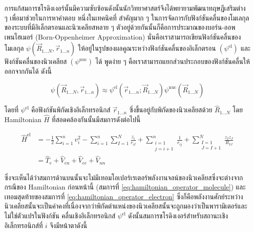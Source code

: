 การแก้สมการชโรดิงเงอร์นั้นมีความซับซ้อนดังนั้นนักวิทยาศาสตร์จึงได้พยายามพัฒนาทฤษฎีเสริมต่าง ๆ เพื่อมาช่วยในการหาคำตอบ หนึ่งในเทคนิคที่%
สำคัญมาก ๆ ในการจัดการกับฟังก์ชันคลื่นของโมเลกุลของระบบที่มีอิเล็กตรอนและนิวเคลียสหลาย ๆ ตัวอยู่ด้วยกันนั้นก็คือการประมาณของบอร์น-ออพเพนไฮเมอร์
(Born-Oppenheimer Approximation) นั่นคือเราสามารถเขียนฟังก์ชันคลื่นของโมเลกุล $\psi\left(\vec{R}_{1 \ldots N}, \vec{r}_{1
    \ldots n}\right)$ ให้อยู่ในรูปของผลคูณระหว่างฟังก์ชันคลื่นของอิเล็กตรอน $(\psi^{\mathrm{el}})$ และฟังก์ชันคลื่นของนิวเคลียส
$(\psi^{\text{nuc}})$ ได้ พูดง่าย ๆ คือเราสามารถแยกส่วนประกอบของฟังก์ชันคลื่นให้ออกจากกันได้ ดังนี้

\begin{equation}
  \psi\left(\vec{R}_{1 \ldots N}, \vec{r}_{1 \ldots n}\right)
  \approx
  \psi^{\mathrm{el}}\left(\vec{r}_{1 \ldots . n} ; \vec{R}_{1 \ldots N}\right)
  \psi^{\mathrm{nuc}}\left(\vec{R}_{1 \ldots N}\right)
\end{equation}

\noindent โดยที่ $\psi^{\mathrm{el}}$ คือฟังก์ชันพิกัดเชิงอิเล็กทรอนิกส์ $\vec{r}_{1 \ldots n}$ ซึ่งขึ้นอยู่กับพิกัดของนิวเคลียสด้วย
$\hat{R}_{1 \ldots N}$ โดย Hamiltonian $\hat{H}$ ที่สอดคล้องกันนั้นมีสมการดังต่อไปนี้

\begin{equation}
  \label{eq:hamiltonian_operator_electron}
  \begin{aligned}
    \hat{H}^{\mathrm{el}}
     & = -\frac{1}{2} \sum_{i=1}^{n} v_{i}^{2}
    - \sum_{i=1}^{n} \sum_{I=1}^{N} \frac{z_{i}}{r_{i I}}
    + \sum_{\substack{i=1                      \\ j=i+1}}^{n} \frac{1}{r_{i j}}
    + \sum_{\substack{I=1                      \\ J=I+1}}^{N} \frac{z_{I} z_{J}}{R_{I J}} \\
     & = \hat{T}_{e}
    + \hat{V}_{en}
    + \hat{V}_{ee}
    + \hat{V}_{nn}
  \end{aligned}
\end{equation}

\noindent ซึ่งจะเห็นได้ว่าสมการด้านบนนั้นจะไม่มีเทอมโอเปอร์เรเตอร์พลังงานจลน์ของนิวเคลียสซึ่งจะต่างจากกรณีของ Hamiltonian ก่อนหน้านี้
(สมการที่ \eqref{eq:hamiltonian_operator_molecule}) และเทอมสุดท้ายของสมการที่ \eqref{eq:hamiltonian_operator_electron}
ซึ่งก็คือพลังงานศักย์ระหว่างนิวเคลียสนั้นจะเป็นค่าคงที่เนื่องจากว่าพิกัดตำแหน่งของนิวเคลียสนั้นจะถูกมองว่าเป็นพารามิเตอร์และไม่ใช่ตัวแปรในฟังก์ชัน%
คลื่นเชิงอิเล็กทรอนิกส์ $\psi^{\text{el}}$ ดังนั้นสมการชโรดิงเงอร์สำหรับสถานะเชิงอิเล็กทรอนิกส์ที่ $i$ จึงมีหน้าตาดังนี้

